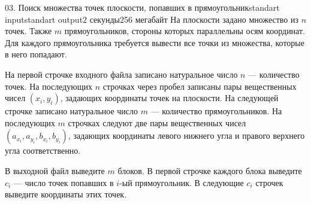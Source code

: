 \begin{problem}{03. Поиск множества точек плоскости, попавших в прямоугольник}{standart input}{standart output}{2 секунды}{256 мегабайт}
На плоскости задано множество из $n$ точек. Также $m$ прямоугольников, стороны которых параллельны осям координат. Для каждого прямоугольника требуется вывести все точки из множества, которые в него попадают.

\InputFile

На первой строчке входного файла записано натуральное число $n$ --- количество точек. На последующих $n$ строчках через пробел записаны пары вещественных чисел $(x_i, y_i)$, задающих координаты точек на плоскости.
На следующей строчке записано натуральное число $m$ --- количество прямоугольников. На последующих $m$ строчках следуют две пары вещественных чисел $(a_{x_i}, a_{y_i}, b_{x_i}, b_{y_i})$, задающих координаты левого нижнего угла и правого верхнего угла соответственно.

\OutputFile

В выходной файл выведите $m$ блоков. В первой строчке каждого блока выведите $c_i$ --- число точек попавших в $i$-ый прямоугольник. В следующие $c_i$ строчек выведите координаты этих точек.

\Examples

\begin{example}%
%
\end{example}

\end{problem}
